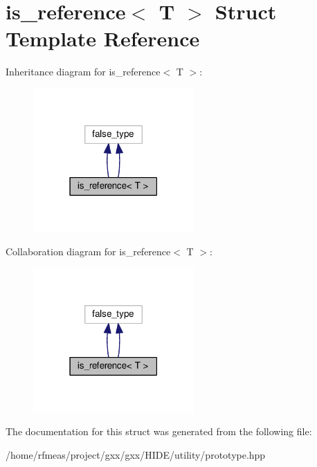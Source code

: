 \hypertarget{structis__reference}{}\section{is\+\_\+reference$<$ T $>$ Struct Template Reference}
\label{structis__reference}


Inheritance diagram for is\+\_\+reference$<$ T $>$\+:
\nopagebreak
\begin{figure}[H]
\begin{center}
\leavevmode
\includegraphics[width=174pt]{structis__reference__inherit__graph}
\end{center}
\end{figure}


Collaboration diagram for is\+\_\+reference$<$ T $>$\+:
\nopagebreak
\begin{figure}[H]
\begin{center}
\leavevmode
\includegraphics[width=174pt]{structis__reference__coll__graph}
\end{center}
\end{figure}


The documentation for this struct was generated from the following file\+:\begin{DoxyCompactItemize}
\item 
/home/rfmeas/project/gxx/gxx/\+H\+I\+D\+E/utility/prototype.\+hpp\end{DoxyCompactItemize}
